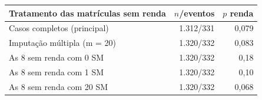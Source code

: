 \begin{tabular}{lrr}
\toprule
Tratamento das matrículas sem renda & $n$/eventos & $p$ renda \\
\midrule
Casos completos (principal) & 1.312/331 & 0,079 \\
Imputação múltipla (m = 20) & 1.320/332 & 0,083 \\
As 8 sem renda com 0 SM & 1.320/332 & 0,18 \\
As 8 sem renda com 1 SM & 1.320/332 & 0,10 \\
As 8 sem renda com 20 SM & 1.320/332 & 0,068 \\
\bottomrule
\end{tabular}
